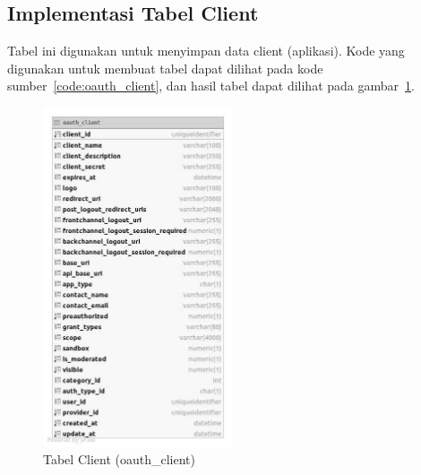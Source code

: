 \subsection{Implementasi Tabel Client}
\par Tabel ini digunakan untuk menyimpan data client (aplikasi). Kode yang digunakan untuk membuat tabel dapat dilihat pada kode sumber~\ref{code:oauth_client}, dan hasil tabel dapat dilihat pada gambar~\ref{tabel_oauth_client}.

\begin{figure}[H]
    \centering\includegraphics[width=0.5\textwidth]{bab4/figures/tabel_oauth_client.jpg}
    \caption{Tabel Client (oauth\_client)}
    \label{tabel_oauth_client}
\end{figure}


